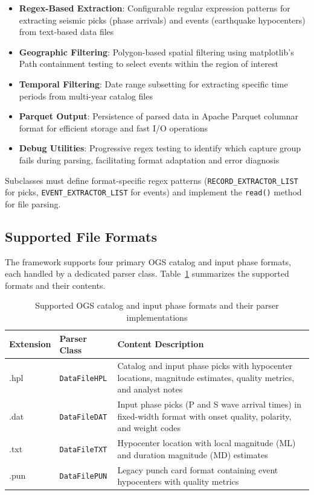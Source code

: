 \begin{itemize}
  \item \textbf{Regex-Based Extraction}: Configurable regular expression
    patterns for extracting seismic picks (phase arrivals) and events
    (earthquake hypocenters) from text-based data files

  \item \textbf{Geographic Filtering}: Polygon-based spatial filtering using
    matplotlib's Path containment testing to select events within the region
    of interest

  \item \textbf{Temporal Filtering}: Date range subsetting for extracting
    specific time periods from multi-year catalog files

  \item \textbf{Parquet Output}: Persistence of parsed data in Apache Parquet
    columnar format for efficient storage and fast I/O operations

  \item \textbf{Debug Utilities}: Progressive regex testing to identify
    which capture group fails during parsing, facilitating format adaptation
    and error diagnosis
\end{itemize}

Subclasses must define format-specific regex patterns
(\texttt{RECORD\_EXTRACTOR\_LIST} for picks, \texttt{EVENT\_EXTRACTOR\_LIST}
for events) and implement the \texttt{read()} method for file parsing.

\subsection{Supported File Formats}
The framework supports four primary OGS catalog and input phase formats, each
handled by a dedicated parser class. Table~\ref{tab:file_formats} summarizes
the supported formats and their contents.

\begin{table}[h]
  \centering
  \caption{Supported OGS catalog and input phase formats and their parser
  implementations}
  \label{tab:file_formats}
  \begin{tabular}{llp{7cm}}
    \hline
    \textbf{Extension} & \textbf{Parser Class} & \textbf{Content
    Description} \\
    \hline
    .hpl & \texttt{DataFileHPL} & Catalog and input phase picks with hypocenter
    locations, magnitude estimates, quality metrics, and analyst notes \\
    .dat & \texttt{DataFileDAT} & Input phase picks (P and S wave
    arrival times) in
    fixed-width format with onset quality, polarity, and weight codes \\
    .txt & \texttt{DataFileTXT} & Hypocenter location with local magnitude (ML)
    and duration magnitude (MD) estimates \\
    .pun & \texttt{DataFilePUN} & Legacy punch card format containing event
    hypocenters with quality metrics \\
    \hline
  \end{tabular}
\end{table}

